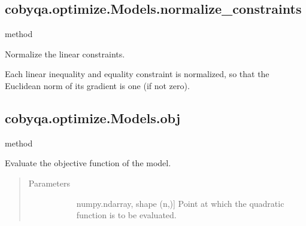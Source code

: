 \documentclass[letterpaper,10pt,english]{sphinxmanual}
\begin{document}
\begin{fulllineitems}
\begin{fulllineitems}
\begin{quote}
\begin{description}
\begin{description}
\end{description}

\end{description}\end{quote}

\end{fulllineitems}



\subsection{cobyqa.optimize.Models.normalize\_constraints}
\label{\detokenize{refs/generated/cobyqa.optimize.Models.normalize_constraints:cobyqa-optimize-models-normalize-constraints}}\label{\detokenize{refs/generated/cobyqa.optimize.Models.normalize_constraints::doc}}
\sphinxAtStartPar
method

\begin{fulllineitems}
\label{\detokenize{refs/generated/cobyqa.optimize.Models.normalize_constraints:cobyqa.optimize.Models.normalize_constraints}}
\sphinxAtStartPar
Normalize the linear constraints.

\sphinxAtStartPar
Each linear inequality and equality constraint is normalized, so that
the Euclidean norm of its gradient is one (if not zero).

\end{fulllineitems}



\subsection{cobyqa.optimize.Models.obj}
\label{\detokenize{refs/generated/cobyqa.optimize.Models.obj:cobyqa-optimize-models-obj}}\label{\detokenize{refs/generated/cobyqa.optimize.Models.obj::doc}}
\sphinxAtStartPar
method

\begin{fulllineitems}
\label{\detokenize{refs/generated/cobyqa.optimize.Models.obj:cobyqa.optimize.Models.obj}}
\sphinxAtStartPar
Evaluate the objective function of the model.
\begin{quote}\begin{description}
\item[{Parameters}] \leavevmode\begin{description}
\item[{}] \leavevmode{[}numpy.ndarray, shape (n,){]}
\sphinxAtStartPar
Point at which the quadratic function is to be evaluated.


\end{description}
\end{description}
\end{quote}
\end{fulllineitems}
\end{fulllineitems}
\end{document}
